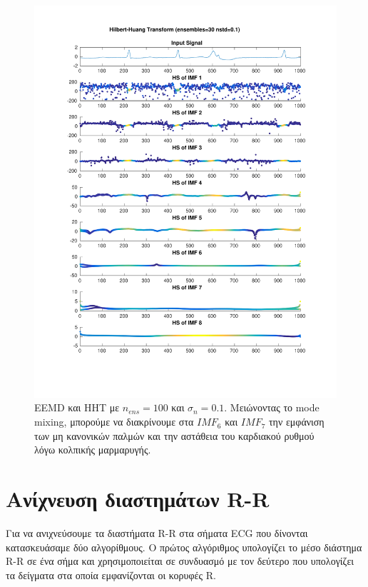 \documentclass[11pt,a4paper]{article}
\begin{document}
\begin{figure}[H]
\begin{minipage}{0.48\textwidth}
	\includegraphics[width=\textwidth]{fig/221l1_hht_ensemble.pdf}
\end{minipage}
\vfill
\caption{EEMD και HHT με $n_{ens}=100$ και $\sigma_n = 0.1$. Μειώνοντας το mode mixing, μπορούμε να διακρίνουμε στα $IMF_{6}$ και $IMF_{7}$ την εμφάνιση των μη κανονικών παλμών και την αστάθεια του καρδιακού ρυθμού λόγω κολπικής μαρμαρυγής.}
\label{fig:221l1_hht_ensemble}
\end{figure}

\section*{Ανίχνευση διαστημάτων R-R}

Για να ανιχνεύσουμε τα διαστήματα R-R στα σήματα ECG που δίνονται κατασκευάσαμε δύο αλγορίθμους. Ο πρώτος αλγόριθμος υπολογίζει το μέσο διάστημα R-R σε ένα σήμα και χρησιμοποιείται σε συνδυασμό με τον δεύτερο που υπολογίζει τα δείγματα στα οποία εμφανίζονται οι κορυφές R.
\end{document}
